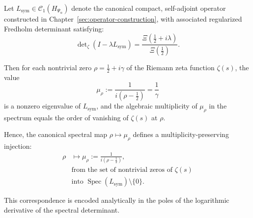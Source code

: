 \begin{lemma}
\label{lem:zero_to_eigenvalue_injection}
Let \( L_{\mathrm{sym}} \in \mathcal{C}_1(H_{\Psi_\alpha}) \) denote the canonical compact, self-adjoint operator constructed in Chapter~\ref{sec:operator-construction}, with associated regularized Fredholm determinant satisfying:
\[
\det\nolimits_\zeta(I - \lambda L_{\mathrm{sym}})
= \frac{\Xi\left(\tfrac{1}{2} + i\lambda\right)}{\Xi\left(\tfrac{1}{2}\right)}.
\]

Then for each nontrivial zero \( \rho = \tfrac{1}{2} + i\gamma \) of the Riemann zeta function \( \zeta(s) \), the value
\[
\mu_\rho := \frac{1}{i(\rho - \tfrac{1}{2})} = \frac{1}{\gamma}
\]
is a nonzero eigenvalue of \( L_{\mathrm{sym}} \), and the algebraic multiplicity of \( \mu_\rho \) in the spectrum equals the order of vanishing of \( \zeta(s) \) at \( \rho \).

\medskip
\noindent
Hence, the canonical spectral map \( \rho \mapsto \mu_\rho \) defines a multiplicity-preserving injection:
\[
\begin{aligned}
\rho &\longmapsto \mu_\rho := \frac{1}{i(\rho - \tfrac{1}{2})}, \\
&\text{from the set of nontrivial zeros of } \zeta(s) \\
&\text{into } \operatorname{Spec}(L_{\mathrm{sym}}) \setminus \{0\}.
\end{aligned}
\]

\noindent
This correspondence is encoded analytically in the poles of the logarithmic derivative of the spectral determinant.
\end{lemma}
% 